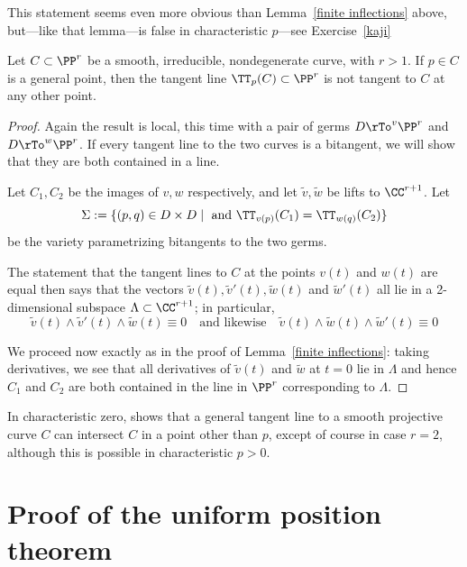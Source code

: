  This statement seems even more obvious than Lemma~\ref{finite inflections} above, but---like that lemma---is false in characteristic $p$---see Exercise~\ref{kaji}
 
 
 
 \begin{lemma}\label{tangent not bitangent}
 Let $C \subset \PP^r$ be a smooth, irreducible, nondegenerate curve, with $r > 1$. If $p \in C$ is a general point, then the tangent line $\TT_p(C) \subset \PP^r$ is not tangent to $C$ at any other point.
 \end{lemma}
 
 \begin{proof} Again the result is local, this time with a pair of germs $D\rTo^v \PP^r$ and $D\rTo^w \PP^r$. If every
 tangent line to the two curves is a bitangent, we will show that they are both contained in a line.
 
  Let $C_1, C_2$ be the images of $v,w$ respectively, and let $\tilde v, \tilde w$ be lifts to $\CC^{r+1}$.
 Let  
 $$
 \Sigma := \{ (p,q) \in D \times D \mid \text{ and }\TT_{v(p)}(C_1) = \TT_{w(q)}(C_2) \}
 $$
 be the variety parametrizing bitangents to the two germs. 
 
 
 
 The statement that the tangent lines to $C$ at the points $v(t)$ and $w(t)$ are equal then says that the vectors $\tilde v(t), \tilde v'(t),\tilde w(t)$ and $\tilde w'(t)$ all lie in a 2-dimensional subspace $\Lambda \subset \CC^{r+1}$; in particular,
 $$
 \tilde v(t) \wedge \tilde v'(t) \wedge \tilde w(t) \equiv 0 \quad \text{and likewise} \quad \tilde v(t) \wedge \tilde w(t) \wedge \tilde w'(t) \equiv 0
 $$
 
We proceed now exactly as in the proof of Lemma~\ref{finite inflections}: taking derivatives, we see that all derivatives of $\tilde v(t)$
and $\tilde w$ at $t=0$ lie in $\Lambda$
and hence $C_1$ and $C_2$ are both contained in the line in $\PP^r$ corresponding to $\Lambda$.
 \end{proof}

In characteristic zero, \cite[Theorem 3.1]{kaji-tangentialDegeneracy} shows that a general tangent line to a smooth projective curve $C$ can intersect $C$ in a point other than $p$, except of course in case $r=2$, although this is possible in characteristic $p>0$.

\section{Proof of the uniform position theorem}

